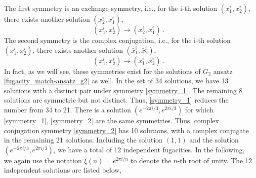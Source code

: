 \documentclass[a4paper,12pt]{article}
\begin{document}
The first symmetry is an exchange symmetry, i.e., for the i-th solution $(x_1^i,x_2^i)$, there exists another solution $(x_2^i,x_1^i)$,
   \begin{equation}\label{symmetry_1}
        (x_1^i,x_2^i)\to (x_2^i,x_1^i)\, .
    \end{equation} 
The second symmetry is the complex conjugation, i.e., for the i-th solution $(x_1^i,x_2^i)$, there exists another solution $(\bar x_1^i,\bar x_2^i)$,
    \begin{equation}\label{symmetry_2}
        (x_1^i,x_2^i)\to (\bar x_1^i,\bar x_2^i)\, .
    \end{equation}
In fact, as we will see, these symmetries exist for the solutions of $G_2$ ansatz \eqref{fugacity_match-ansatz_g2} as well.
In the set of 34 solutions, we have 13 solutions with a distinct pair under symmetry \eqref{symmetry_1}. The remaining 8 solutions are symmetric but not distinct. Thus, \eqref{symmetry_1} reduces the number from 34 to 21. There is a solution $(e^{-2\pi i/3},e^{2\pi i/3})$ for which \eqref{symmetry_1}, \eqref{symmetry_2} are the same symmetries. Thus, complex conjugation symmetry \eqref{symmetry_2} has 10 solutions, with a complex conjugate in the remaining 21 solutions. Including the solution $(1,1)$ and the solution $(e^{-2\pi i/3},e^{2\pi i/3})$, we have a total of 12 independent fugacities. In the following, we again use the notation $\xi(n)=e^{2\pi i/n}$ to denote the $n$-th root of unity. The 12 independent solutions are listed below,
\begin{comment}
\begin{align}\label{dep_a2_flavour_fugacities}
    \begin{pmatrix}
        x_1^i\\
        x_2^i
    \end{pmatrix}=
    \left(
    \begin{array}{cc}
        1 & 1 \\
       \xi(7)^1  & \xi(7)^2\\
       \xi(7)^1 & \xi(7)^4\\
       \xi(7)^2  & \xi(7)^8\\
       \xi(9)^1 & \xi(9)^1\\
       \xi(9)^1 & \xi(9)^4\\
       \xi(9)^1 & \xi(9)^7\\
       \xi(9)^2 & \xi(9)^2\\
       \xi(9)^2 & \xi(9)^5\\
       \xi(9)^3 & \xi(9)^3\\
       \xi(9)^3 & \xi(9)^6\\  
       \xi(9)^4 & \xi(9)^4\\      
    \end{array}
    \right)\, ,\quad i=\{1,\cdots,12\}\, .
\end{align}
\end{comment}
\end{document}
